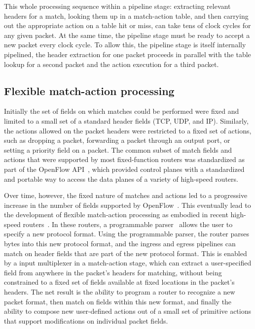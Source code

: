 This whole processing sequence within a pipeline stage: extracting relevant
headers for a match, looking them up in a match-action table, and then carrying
out the appropriate action on a table hit or miss, can take tens of clock
cycles for any given packet. At the same time, the pipeline stage must be ready
to accept a new packet every clock cycle. To allow this, the pipeline stage is
itself internally pipelined, \ie the header extraction for one packet proceeds
in parallel with the table lookup for a second packet and the action execution
for a third packet.

\subsection{Flexible match-action processing}
Initially the set of fields on which matches could be performed were fixed and
limited to a small set of a standard header fields (\eg TCP, UDP, and IP).
Similarly, the actions allowed on the packet headers were restricted to a fixed
set of actions, such as dropping a packet, forwarding a packet through an
output port, or setting a priority field on a packet. The common subset of
match fields and actions that were supported by most fixed-function routers was
standardized as part of the OpenFlow API~\cite{openflow}, which provided
control planes with a standardized and portable way to access the data planes
of a variety of high-speed routers.

Over time, however, the fixed nature of matches and actions led to a
progressive increase in the number of fields supported by OpenFlow~\cite{p4}.
This eventually lead to the development of flexible match-action processing as
embodied in recent high-speed routers~\cite{xpliant, flexpipe, tofino}. In
these routers, a programmable parser~\cite{gibb_parsing} allows the user to
specify a new protocol format. Using the programmable parser, the router parses
bytes into this new protocol format, and the ingress and egress pipelines can
match on header fields that are part of the new protocol format.  This is
enabled by a input multiplexer in a match-action stage, which can extract a
user-specified field from anywhere in the packet's headers for matching,
without being constrained to a fixed set of fields available at fixed locations
in the packet's headers. The net result is the ability to program a router to
recognize a new packet format, then match on fields within this new format, and
finally the ability to compose new user-defined actions out of a small set of
primitive actions that support modifications on individual packet fields.


